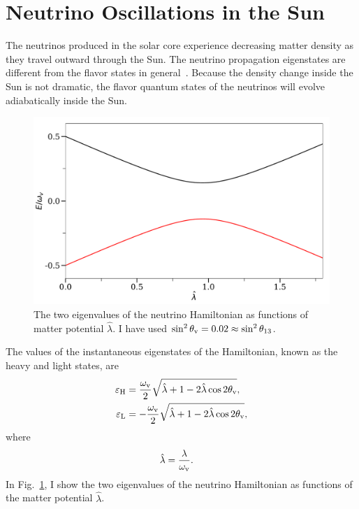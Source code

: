 \section{\label{chap:matter-sec:solar-neutrinos}Neutrino Oscillations in the Sun}



The neutrinos produced in the solar core experience decreasing matter density as they travel outward through the Sun. The neutrino propagation eigenstates are different from the flavor states in general~\cite{wolf78}.
Because the density change inside the Sun is not dramatic, the flavor quantum states of the neutrinos will evolve adiabatically inside the Sun.

\begin{figure}[htbp]
\centering
\includegraphics[width=0.7\columnwidth]{chapters/assets/matter/mswEnergyLevels}
\caption{The two eigenvalues of the neutrino Hamiltonian as functions of matter potential $\hat\lambda$. I have used $\sin^2\theta_\mathrm v = 0.02 \approx \sin^2 \theta_{13}$.}
\label{fig:mswEnergyLevels}
\end{figure}

The values of the instantaneous eigenstates of the Hamiltonian, known as the heavy and light states, are
\begin{align}
\varepsilon_{\mathrm H} &= \frac{\omega_\mathrm v}{2}\sqrt{ \hat\lambda +1 -  2\hat\lambda \cos 2\theta_\mathrm v }, \\
\varepsilon_{\mathrm L} &= -\frac{\omega_\mathrm v}{2}\sqrt{ \hat\lambda +1 -  2\hat\lambda \cos 2\theta_\mathrm v },
\end{align}
where
\begin{align}
\hat\lambda & = \frac{\lambda}{\omega_\mathrm v}.
\end{align}
In Fig.~\ref{fig:mswEnergyLevels}, I show the two eigenvalues of the neutrino Hamiltonian as functions of the matter potential $\hat \lambda$.

